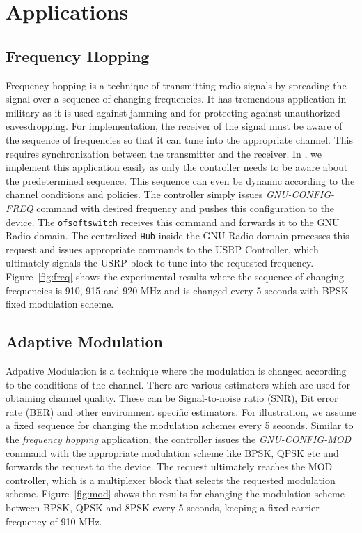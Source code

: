 \section{Applications}

\subsection{Frequency Hopping}
Frequency hopping is a technique of transmitting radio signals by spreading the signal over a sequence of changing frequencies. It has tremendous application in military as it is used against jamming and for protecting against unauthorized eavesdropping. For implementation, the receiver of the signal must be aware of the sequence of frequencies so that it can tune into the appropriate channel. This requires synchronization between the transmitter and the receiver. In \crossflow, we implement this application easily as only the controller needs to be aware about the predetermined sequence. This sequence can even be dynamic according to the channel conditions and policies. The controller simply issues \emph{GNU-CONFIG-FREQ} command with desired frequency and pushes this configuration to the device. The \texttt{ofsoftswitch} receives this command and forwards it to the GNU Radio domain. The centralized \texttt{\crossflow Hub} inside the GNU Radio domain processes this request and issues appropriate commands to the  USRP Controller, which ultimately signals the USRP block to tune into the requested frequency. Figure~\ref{fig:freq} shows the experimental results where the sequence of changing frequencies is 910, 915 and 920 MHz and is changed every 5 seconds with BPSK fixed modulation scheme.   

\subsection{Adaptive Modulation}
Adpative Modulation is a technique where the modulation is changed according to the conditions of the channel. There are various estimators which are used for obtaining channel quality. These can be Signal-to-noise ratio (SNR), Bit error rate (BER) and other environment specific estimators. For illustration, we assume a fixed sequence for changing the modulation schemes every 5 seconds. Similar to the \emph{frequency hopping} application, the controller issues the \emph{GNU-CONFIG-MOD} command with the appropriate modulation scheme like BPSK, QPSK etc and forwards the request to the device. The request ultimately reaches the MOD controller, which is a multiplexer block that selects the requested modulation scheme. Figure~\ref{fig:mod} shows the results for changing the modulation scheme between BPSK, QPSK and 8PSK every 5 seconds, keeping a fixed carrier frequency of 910 MHz.   

